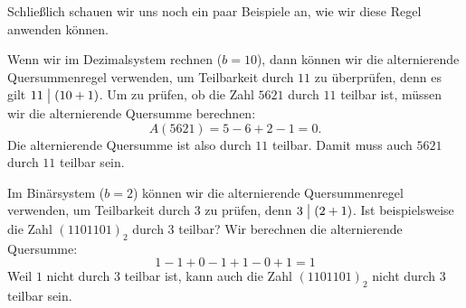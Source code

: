 \documentclass[../../main.tex]{subfiles}
\begin{document}
Schließlich schauen wir uns noch ein paar Beispiele an, wie wir diese Regel anwenden können.
\begin{example}{}
    Wenn wir im Dezimalsystem rechnen ($b=10$), dann können wir die alternierende Quersummenregel verwenden, um
    Teilbarkeit durch $11$ zu überprüfen, denn es gilt $11\divides (10+1)$. Um zu prüfen, ob die Zahl $5621$ durch $11$
    teilbar ist, müssen wir die alternierende Quersumme berechnen:
    \[A(5621)=5-6+2-1=0.\]
    Die alternierende Quersumme ist also durch $11$ teilbar. Damit muss auch $5621$ durch $11$ teilbar sein.
\end{example}
\begin{example}{}
    Im Binärsystem ($b=2$) können wir die alternierende Quersummenregel verwenden, um Teilbarkeit durch $3$ zu prüfen,
    denn $3\divides (2+1)$. Ist beispielsweise die Zahl $(1101101)_2$ durch $3$ teilbar? Wir berechnen die alternierende
    Quersumme:
    \[1-1+0-1+1-0+1=1\]
    Weil $1$ nicht durch $3$ teilbar ist, kann auch die Zahl $(1101101)_2$ nicht durch $3$ teilbar sein.
\end{example}

\newpage
\pagecolor{white}
\end{document}
